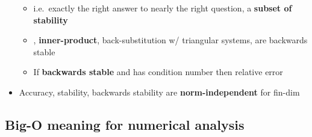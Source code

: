 \begin{itemize}
  \begin{itemize}
  
  \item
    i.e.~exactly the right answer to nearly the right question, a
    \textbf{subset of stability}
  \item
    \iMbox{\oplus, \ominus, \otimes, \oslash}, \textbf{inner-product},
    back-substitution w/ triangular systems, are backwards stable
  \item
    If \textbf{backwards stable}  and  has
    condition number  then relative error
  \end{itemize}
\item
  Accuracy, stability, backwards stability are \textbf{norm-independent}
  for fin-dim 
\end{itemize}

\subsection*{Big-O meaning for numerical
analysis}

